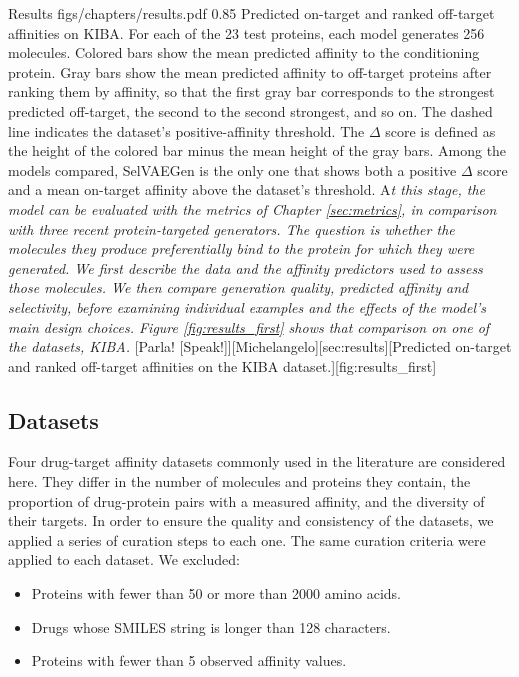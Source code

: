 \documentclass[a4paper,12pt]{article}
\begin{document}
\chapteropening
{Results}
{figs/chapters/results.pdf}
{0.85\textwidth}
{Predicted on-target and ranked off-target affinities on KIBA. For each of the 23 test proteins, each model generates 256 molecules. Colored bars show the mean predicted affinity to the conditioning protein. Gray bars show the mean predicted affinity to off-target proteins after ranking them by affinity, so that the first gray bar corresponds to the strongest predicted off-target, the second to the second strongest, and so on. The dashed line indicates the dataset’s positive-affinity threshold. The $\Delta$ score is defined as the height of the colored bar minus the mean height of the gray bars. Among the models compared, SelVAEGen is the only one that shows both a positive $\Delta$ score and a mean on-target affinity above the dataset’s threshold.}
{%
    \lettrine[
        lines=2,
        lhang=0.0,
        loversize=0.0
    ]{A}{}\textit{t this stage, the model can be evaluated with the metrics of Chapter \ref{sec:metrics}, in comparison with three recent protein-targeted generators. The question is whether the molecules they produce preferentially bind to the protein for which they were generated. We first describe the data and the affinity predictors used to assess those molecules. We then compare generation quality, predicted affinity and selectivity, before examining individual examples and the effects of the model's main design choices. Figure \ref{fig:results_first} shows that comparison on one of the datasets, KIBA.}
}[Parla! [Speak!]][Michelangelo][sec:results][Predicted on-target and ranked off-target affinities on the KIBA dataset.][fig:results_first]

\subsection{Datasets}\label{sec:datasets}

Four drug-target affinity datasets commonly used in the literature are considered here. They differ in the number of molecules and proteins they contain, the proportion of drug-protein pairs with a measured affinity, and the diversity of their targets. In order to ensure the quality and consistency of the datasets, we applied a series of curation steps to each one. The same curation criteria were applied to each dataset. We excluded:
\begin{itemize}
    \item Proteins with fewer than 50 or more than 2000 amino acids.
    \item Drugs whose SMILES string is longer than 128 characters.
    \item Proteins with fewer than 5 observed affinity values.
\end{itemize}
\end{document}
